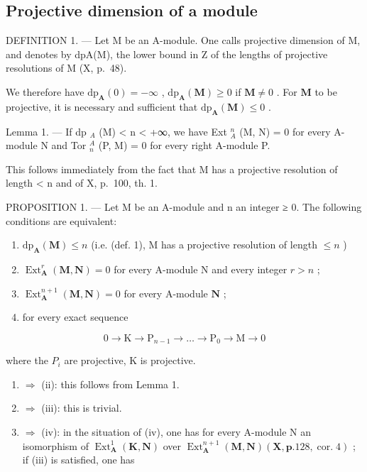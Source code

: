 \subsection{Projective dimension of a module}

DEFINITION 1. --- Let M be an A-module. One calls projective dimension of M, and denotes by dpA(M), the lower bound in Z of the lengths of projective resolutions of M (X, p.~48).

We therefore have \(\mathrm{dp}_{\mathbf{A}}(0) = -\infty\) , \(\mathrm{dp}_{\mathbf{A}}(\mathbf{M}) \geqslant 0\) if \(\mathbf{M} \neq 0\) . For \(\mathbf{M}\) to be projective, it is necessary and sufficient that \(\mathrm{dp}_{\mathbf{A}}(\mathbf{M}) \leqslant 0\) .

Lemma 1. --- If dp \(_{A}\) (M) \textless{} n \textless{} +∞, we have Ext \(_{A}^{n}\) (M, N) = 0 for every A-module N and Tor \(_{n}^{A}\) (P, M) = 0 for every right A-module P.

This follows immediately from the fact that M has a projective resolution of length \textless{} n and of X, p.~100, th. 1.

PROPOSITION 1. --- Let M be an A-module and n an integer ≥ 0. The following conditions are equivalent:

\begin{enumerate}
\def\labelenumi{(\roman{enumi})}
\item
  \(\mathrm{dp}_{\mathbf{A}}(\mathbf{M}) \leqslant n\) (i.e. (def. 1), M has a projective resolution of length \(\leqslant n\) )
\item
  \(\operatorname{Ext}_{\mathbf{A}}^{r}(\mathbf{M},\mathbf{N}) = 0\) for every A-module N and every integer \(r > n\) ;
\item
  \(\operatorname{Ext}_{\mathbf{A}}^{n+1}(\mathbf{M}, \mathbf{N}) = 0\) for every A-module \(\mathbf{N}\) ;
\item
  for every exact sequence
\end{enumerate}

\[
0 \rightarrow \mathrm{K} \rightarrow \mathrm{P} _ {n - 1} \rightarrow \dots \rightarrow \mathrm{P} _ {0} \rightarrow \mathrm{M} \rightarrow 0
\]

where the \(P_{i}\) are projective, K is projective.

\begin{enumerate}
\def\labelenumi{(\roman{enumi})}
\item
  \(\Rightarrow\) (ii): this follows from Lemma 1.
\item
  \(\Rightarrow\) (iii): this is trivial.
\item
  \(\Rightarrow\) (iv): in the situation of (iv), one has for every A-module N an isomorphism of \(\operatorname{Ext}_{\mathbf{A}}^{1}(\mathbf{K},\mathbf{N})\) over \(\operatorname{Ext}_{\mathbf{A}}^{n + 1}(\mathbf{M},\mathbf{N})(\mathbf{X},\mathbf{p}.128,\operatorname{cor.}4)\) ; if (iii) is satisfied, one has
\end{enumerate}

